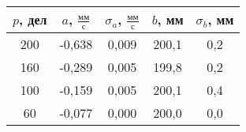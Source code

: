 \begin{tabular}[t]{|c|c|c|c|c|}
\hline
$p$, дел & $a$, $\frac{мм}{с}$ & $\sigma_a$, $\frac{мм}{с}$ & $b$, мм & $\sigma_b$, мм \\ 
\hline
200 & -0,638 & 0,009 & 200,1 & 0,2 \\ 
160 & -0,289 & 0,005 & 199,8 & 0,2 \\ 
100 & -0,159 & 0,005 & 200,1 & 0,4 \\ 
60 & -0,077 & 0,000 & 200,0 & 0,0 \\ 
\hline
\end{tabular}